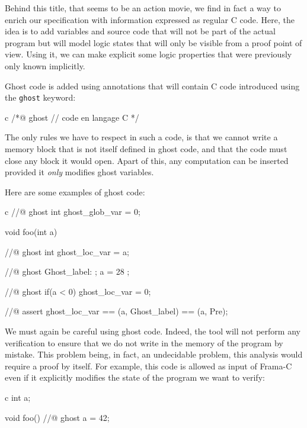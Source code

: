 
Behind this title, that seems to be an action movie, we find in fact a
way to enrich our specification with information expressed as regular C
code. Here, the idea is to add variables and source code that will not
be part of the actual program but will model logic states that will only
be visible from a proof point of view. Using it, we can make explicit
some logic properties that were previously only known implicitly.




Ghost code is added using annotations that will contain C code
introduced using the \texttt{ghost} keyword:



\begin{CodeBlock}{c}
/*@
  ghost
  // code en langage C
*/
\end{CodeBlock}



The only rules we have to respect in such a code, is that we cannot
write a memory block that is not itself defined in ghost code, and that
the code must close any block it would open. Apart of this, any
computation can be inserted provided it \emph{only} modifies ghost
variables.




Here are some examples of ghost code:



\begin{CodeBlock}{c}
//@ ghost int ghost_glob_var = 0;

void foo(int a){
  //@ ghost int ghost_loc_var = a;

  //@ ghost Ghost_label: ;
  a = 28 ;

  //@ ghost if(a < 0){ ghost_loc_var = 0; }

  //@ assert ghost_loc_var == \at(a, Ghost_label) == \at(a, Pre);
}
\end{CodeBlock}



We must again be careful using ghost code. Indeed, the tool will not
perform any verification to ensure that we do not write in the memory of
the program by mistake. This problem being, in fact, an undecidable
problem, this analysis would require a proof by itself. For example,
this code is allowed as input of Frama-C even if it explicitly modifies
the state of the program we want to verify:



\begin{CodeBlock}{c}
int a;

void foo(){
  //@ ghost a = 42;
}
\end{CodeBlock}



